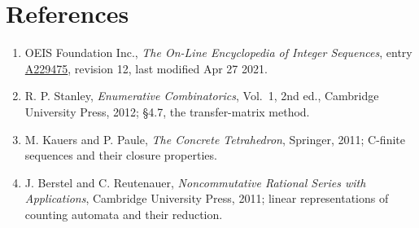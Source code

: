 \documentclass[11pt]{article}
\theoremstyle{definition}
\begin{document}
\section{References}

\begin{enumerate}

\item OEIS Foundation Inc., \emph{The On-Line Encyclopedia of Integer Sequences}, entry \href{https://oeis.org/A229475}{A229475}, revision 12, last modified Apr 27 2021.

\item R. P. Stanley, \emph{Enumerative Combinatorics}, Vol.~1, 2nd ed., Cambridge University Press, 2012; \S4.7, the transfer-matrix method.

\item M. Kauers and P. Paule, \emph{The Concrete Tetrahedron}, Springer, 2011; C-finite sequences and their closure properties.

\item J. Berstel and C. Reutenauer, \emph{Noncommutative Rational Series with Applications}, Cambridge University Press, 2011; linear representations of counting automata and their reduction.

\end{enumerate}
\end{document}
